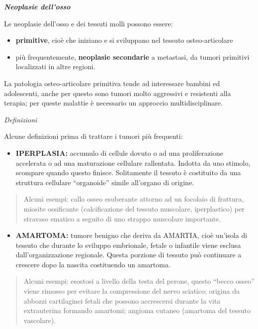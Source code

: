 \documentclass[]{article}
\date{}
\begin{document}
\emph{\textbf{Neoplasie dell'osso}}

Le neoplasie dell'osso e dei tessuti molli possono essere:

\begin{itemize}
\item
  \textbf{primitive}, cioè che iniziano e si sviluppano nel tessuto
  osteo-articolare
\item
  più frequentemente, \textbf{neoplasie secondarie} a metastasi, da
  tumori primitivi localizzati in altre regioni.
\end{itemize}

La patologia osteo-articolare primitiva tende ad interessare bambini ed
adolescenti, anche per questo sono tumori molto aggressivi e resistenti
alla terapia; per queste malattie è necessario un approccio
multidisciplinare.

\emph{Definizioni}

Alcune definizioni prima di trattare i tumori più frequenti:

\begin{itemize}
\item
  \textbf{IPERPLASIA:} accumulo di cellule dovuto o ad una
  proliferazione accelerata o ad una maturazione cellulare rallentata.
  Indotta da uno stimolo, scompare quando questo finisce. Solitamente il
  tessuto è costituito da una struttura cellulare ``organoide'' simile
  all'organo di origine.
\end{itemize}

\begin{quote}
Alcuni esempi: callo osseo esuberante attorno ad un focolaio di
frattura, miosite ossificante (calcificazione del tessuto muscolare,
iperplastico) per stravaso ematico a seguito di uno strappo muscolare
importante.
\end{quote}

\begin{itemize}
\item
  \textbf{AMARTOMA:} tumore benigno che deriva da AMARTIA, cioè un'isola
  di tessuto che durante lo sviluppo embrionale, fetale o infantile
  viene esclusa dall'organizzazione regionale. Questa porzione di
  tessuto può continuare a crescere dopo la nascita costituendo un
  amartoma.
\end{itemize}

\begin{quote}
Alcuni esempi: esostosi a livello della testa del perone, questo ``becco
osseo'' viene rimosso per evitare la compressione del nervo sciatico;
origina da abbozzi cartilaginei fetali che possono accrescersi durante
la vita extrauterina formando amartomi; angioma cutaneo (amartoma del
tessuto vascolare).
\end{quote}
\end{document}
